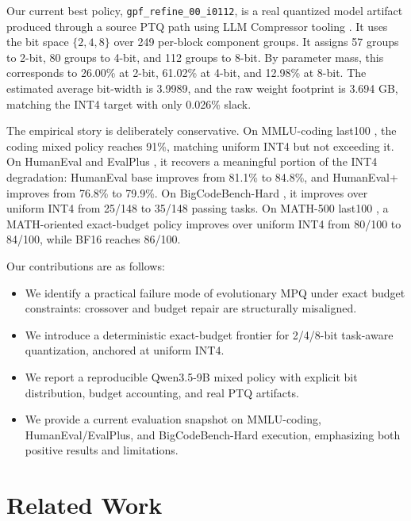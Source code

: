 \documentclass{article}
\newcommand{\policyid}{\texttt{gpf\_refine\_00\_i0112}}
\begin{document}
Our current best policy, \policyid{}, is a real quantized model artifact produced through a source PTQ path using LLM Compressor tooling \cite{llmcompressor}. It uses the bit space $\{2,4,8\}$ over 249 per-block component groups. It assigns 57 groups to 2-bit, 80 groups to 4-bit, and 112 groups to 8-bit. By parameter mass, this corresponds to 26.00\% at 2-bit, 61.02\% at 4-bit, and 12.98\% at 8-bit. The estimated average bit-width is 3.9989, and the raw weight footprint is 3.694 GB, matching the INT4 target with only 0.026\% slack.

The empirical story is deliberately conservative. On MMLU-coding last100 \cite{hendrycks2021mmlu}, the coding mixed policy reaches 91\%, matching uniform INT4 but not exceeding it. On HumanEval and EvalPlus \cite{chen2021humaneval,liu2023evalplus}, it recovers a meaningful portion of the INT4 degradation: HumanEval base improves from 81.1\% to 84.8\%, and HumanEval+ improves from 76.8\% to 79.9\%. On BigCodeBench-Hard \cite{zhuo2024bigcodebench}, it improves over uniform INT4 from 25/148 to 35/148 passing tasks. On MATH-500 last100 \cite{hendrycks2021math}, a MATH-oriented exact-budget policy improves over uniform INT4 from 80/100 to 84/100, while BF16 reaches 86/100.

Our contributions are as follows:
\begin{itemize}
    \item We identify a practical failure mode of evolutionary MPQ under exact budget constraints: crossover and budget repair are structurally misaligned.
    \item We introduce a deterministic exact-budget frontier for 2/4/8-bit task-aware quantization, anchored at uniform INT4.
    \item We report a reproducible Qwen3.5-9B mixed policy with explicit bit distribution, budget accounting, and real PTQ artifacts.
    \item We provide a current evaluation snapshot on MMLU-coding, HumanEval/EvalPlus, and BigCodeBench-Hard execution, emphasizing both positive results and limitations.
\end{itemize}

\section{Related Work}
\end{document}
